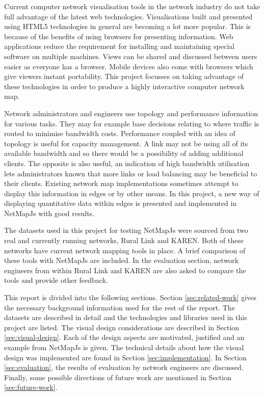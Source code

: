 \documentclass[11pt, a4paper]{article}
\begin{document}
Current computer network visualisation tools in the network industry do not take
full advantage of the latest web technologies. Visualisations built and
presented using HTML5 technologies in general are becoming a lot more popular.
This is because of the benefits of using browsers for presenting information.
Web applications reduce the requirement for installing and maintaining special
software on multiple machines. Views can be shared and discussed between users
easier as everyone has a browser. Mobile devices also come with browsers which
give viewers instant portability. This project focusses on taking advantage of
these technologies in order to produce a highly interactive computer network
map.

Network administrators and engineers use topology and performance information
for various tasks. They may for example base decisions relating to where traffic
is routed to minimise bandwidth costs. Performance coupled with an idea of
topology is useful for capacity management. A link may not be using all of its
available bandwidth and so there would be a possibility of adding additional
clients. The opposite is also useful, an indication of high bandwidth
utilisation lets administrators known that more links or load balancing may be
beneficial to their clients. Existing network map implementations sometimes
attempt to display this information in edges or by other means. In this project,
a new way of displaying quantitative data within edges is presented and
implemented in NetMapJs with good results.


The datasets used in this project for testing NetMapJs were sourced from two
real and currently running networks, Rural Link and KAREN. Both of these
networks have current network mapping tools in place. A brief comparison of
these tools with NetMapJs are included. In the evaluation section, network
engineers from within Rural Link and KAREN are also asked to compare the tools
and provide other feedback. 

This report is divided into the following sections. Section
\ref{sec:related-work} gives the necessary background information used for the
rest of the report. The datasets are described in detail and the technologies
and libraries used in this project are listed. The visual design considerations
are described in Section \ref{sec:visual-design}. Each of the design aspects
are motivated, justified and an example from NetMapJs is given. The technical
details about how the visual design was implemented are found in Section
\ref{sec:implementation}. In Section \ref{sec:evaluation}, the results of
evaluation by network engineers are discussed. Finally, some possible directions
of future work are mentioned in Section \ref{sec:future-work}.
\end{document}
